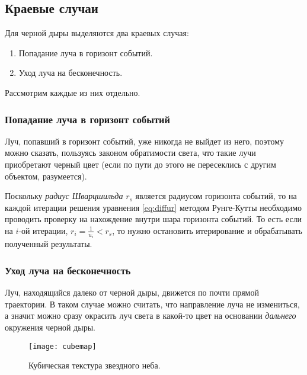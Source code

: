 \newpage

\subsection{Краевые случаи}
\label{subsec:corner_cases}
Для черной дыры выделяются два краевых случая:

\begin{enumerate}
    \item Попадание луча в горизонт событий.
    \item Уход луча на бесконечность.
\end{enumerate}

Рассмотрим каждые из них отдельно.

\subsubsection{Попадание луча в горизонт событий}
\label{subsubsec:events_horizon}

Луч, попавший в горизонт событий, уже никогда не выйдет из него, поэтому можно сказать, пользуясь законом обратимости света, что такие лучи приобретают черный цвет (если по пути до этого не пересеклись с другим объектом, разумеется).

Поскольку \textit{радиус Шварцшильда} $r_s$ является радиусом горизонта событий, то на каждой итерации решения уравнения \eqref{eq:diffur} методом Рунге-Кутты необходимо проводить проверку на нахождение внутри шара горизонта событий. То есть если на $i$-ой итерации, $r_i = \frac{1}{u_i} < r_s$, то нужно остановить итерирование и обрабатывать полученный результаты.

\subsubsection{Уход луча на бесконечность}
\label{subsubsec:goes_to_infinity}

Луч, находящийся далеко от черной дыры, движется по почти прямой траектории. В таком случае можно считать, что направление луча не измениться, а значит можно сразу окрасить луч света в какой-то цвет на основании \textit{дальнего} окружения черной дыры.

\newpage

\begin{figure}[h]
    \centering
    \texttt{[image: cubemap]}
    \caption{Кубическая текстура звездного неба.}
    \label{fig:cubemap}
\end{figure}

